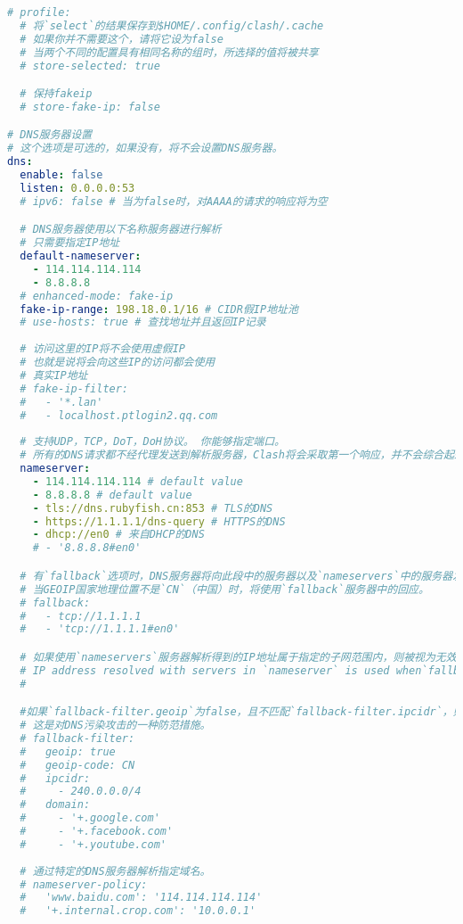 \begin{lstlisting}[breaklines=true,language=yaml,style=yaml]
# profile:
  # 将`select`的结果保存到$HOME/.config/clash/.cache
  # 如果你并不需要这个，请将它设为false
  # 当两个不同的配置具有相同名称的组时，所选择的值将被共享
  # store-selected: true

  # 保持fakeip
  # store-fake-ip: false

# DNS服务器设置
# 这个选项是可选的，如果没有，将不会设置DNS服务器。
dns:
  enable: false
  listen: 0.0.0.0:53
  # ipv6: false # 当为false时，对AAAA的请求的响应将为空 

  # DNS服务器使用以下名称服务器进行解析 
  # 只需要指定IP地址
  default-nameserver:
    - 114.114.114.114
    - 8.8.8.8
  # enhanced-mode: fake-ip
  fake-ip-range: 198.18.0.1/16 # CIDR假IP地址池
  # use-hosts: true # 查找地址并且返回IP记录
  
  # 访问这里的IP将不会使用虚假IP
  # 也就是说将会向这些IP的访问都会使用
  # 真实IP地址
  # fake-ip-filter:
  #   - '*.lan'
  #   - localhost.ptlogin2.qq.com
  
  # 支持UDP，TCP，DoT，DoH协议。 你能够指定端口。
  # 所有的DNS请求都不经代理发送到解析服务器，Clash将会采取第一个响应，并不会综合起来。 
  nameserver:
    - 114.114.114.114 # default value
    - 8.8.8.8 # default value
    - tls://dns.rubyfish.cn:853 # TLS的DNS
    - https://1.1.1.1/dns-query # HTTPS的DNS
    - dhcp://en0 # 来自DHCP的DNS 
    # - '8.8.8.8#en0'

  # 有`fallback`选项时，DNS服务器将向此段中的服务器以及`nameservers`中的服务器发送并发请求 
  # 当GEOIP国家地理位置不是`CN`（中国）时，将使用`fallback`服务器中的回应。 
  # fallback:
  #   - tcp://1.1.1.1
  #   - 'tcp://1.1.1.1#en0'

  # 如果使用`nameservers`服务器解析得到的IP地址属于指定的子网范围内，则被视为无效地址，DNS服务器将使用`fallback`服务器返回解析结果。 
  # IP address resolved with servers in `nameserver` is used when`fallback-filter.geoip` is true and when GEOIP of the IP address is `CN`.  当`fallback-filter.geoip`为true且IP地址的GEOIP为`CN`时，将使用在`nameserver`中解析的服务器的IP地址。
  #

  #如果`fallback-filter.geoip`为false，且不匹配`fallback-filter.ipcidr`，则始终使用来自`nameserver`命名服务器的结果。
  # 这是对DNS污染攻击的一种防范措施。
  # fallback-filter:
  #   geoip: true
  #   geoip-code: CN
  #   ipcidr:
  #     - 240.0.0.0/4
  #   domain:
  #     - '+.google.com'
  #     - '+.facebook.com'
  #     - '+.youtube.com'
  
  # 通过特定的DNS服务器解析指定域名。
  # nameserver-policy:
  #   'www.baidu.com': '114.114.114.114'
  #   '+.internal.crop.com': '10.0.0.1'


\end{lstlisting}
